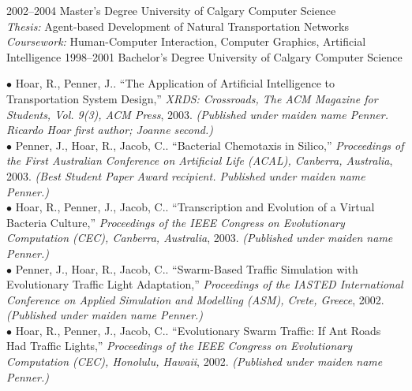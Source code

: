 \documentclass[9pt]{developercv}
\begin{document}
\begin{entrylist}
	\entry
		{2002--2004}
		{Master's Degree}
		{University of Calgary}
		{Computer Science\\[2pt]\footnotesize{\textit{Thesis:} Agent-based Development of Natural Transportation Networks}\\\footnotesize{\textit{Coursework:} Human-Computer Interaction, Computer Graphics, Artificial Intelligence}}
	\entry
		{1998--2001}
		{Bachelor's Degree}
		{University of Calgary}
		{Computer Science}
\end{entrylist}

$\bullet$ Hoar, R., Penner, J.. ``The Application of Artificial Intelligence to Transportation System Design,'' \textit{XRDS: Crossroads, The ACM Magazine for Students, Vol. 9(3), ACM Press}, 2003. \textit{(Published under maiden name Penner. Ricardo Hoar first author; Joanne second.)}\\
$\bullet$ Penner, J., Hoar, R., Jacob, C.. ``Bacterial Chemotaxis in Silico,'' \textit{Proceedings of the First Australian Conference on Artificial Life (ACAL), Canberra, Australia}, 2003. \textit{(Best Student Paper Award recipient. Published under maiden name Penner.)}\\
$\bullet$ Hoar, R., Penner, J., Jacob, C.. ``Transcription and Evolution of a Virtual Bacteria Culture,'' \textit{Proceedings of the IEEE Congress on Evolutionary Computation (CEC), Canberra, Australia}, 2003. \textit{(Published under maiden name Penner.)}\\
$\bullet$ Penner, J., Hoar, R., Jacob, C.. ``Swarm-Based Traffic Simulation with Evolutionary Traffic Light Adaptation,'' \textit{Proceedings of the IASTED International Conference on Applied Simulation and Modelling (ASM), Crete, Greece}, 2002. \textit{(Published under maiden name Penner.)}\\
$\bullet$ Hoar, R., Penner, J., Jacob, C.. ``Evolutionary Swarm Traffic: If Ant Roads Had Traffic Lights,'' \textit{Proceedings of the IEEE Congress on Evolutionary Computation (CEC), Honolulu, Hawaii}, 2002. \textit{(Published under maiden name Penner.)}\\
\end{document}
